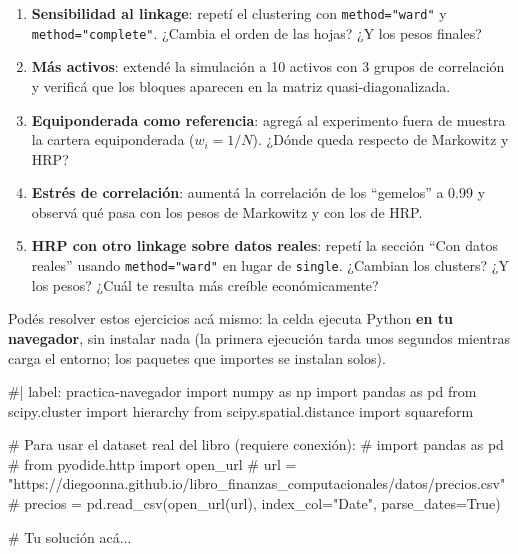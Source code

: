 \documentclass[
  spanish,
  letterpaper,
  DIV=11,
  numbers=noendperiod]{scrreprt}
\newenvironment{Shaded}{\begin{snugshade}}{\end{snugshade}}
\newcommand{\NormalTok}[1]{\textcolor[rgb]{0.00,0.23,0.31}{#1}}
\providecommand{\tightlist}{%
  \setlength{\itemsep}{0pt}\setlength{\parskip}{0pt}}
\begin{document}
\begin{tcolorbox}[enhanced jigsaw, bottomrule=.15mm, colback=white, opacitybacktitle=0.6, arc=.35mm, toprule=.15mm, opacityback=0, breakable, titlerule=0mm, left=2mm, coltitle=black, colbacktitle=quarto-callout-important-color!10!white, colframe=quarto-callout-important-color-frame, leftrule=.75mm, toptitle=1mm, bottomtitle=1mm, title=\textcolor{quarto-callout-important-color}{\faExclamation}\hspace{0.5em}{Ejercicios}, rightrule=.15mm]

\begin{enumerate}
\def\labelenumi{\arabic{enumi}.}
\tightlist
\item
  \textbf{Sensibilidad al linkage}: repetí el clustering con
  \texttt{method="ward"} y \texttt{method="complete"}. ¿Cambia el orden
  de las hojas? ¿Y los pesos finales?
\item
  \textbf{Más activos}: extendé la simulación a 10 activos con 3 grupos
  de correlación y verificá que los bloques aparecen en la matriz
  quasi-diagonalizada.
\item
  \textbf{Equiponderada como referencia}: agregá al experimento fuera de
  muestra la cartera equiponderada (\(w_i = 1/N\)). ¿Dónde queda
  respecto de Markowitz y HRP?
\item
  \textbf{Estrés de correlación}: aumentá la correlación de los
  ``gemelos'' a 0.99 y observá qué pasa con los pesos de Markowitz y con
  los de HRP.
\item
  \textbf{HRP con otro linkage sobre datos reales}: repetí la sección
  ``Con datos reales'' usando \texttt{method="ward"} en lugar de
  \texttt{single}. ¿Cambian los clusters? ¿Y los pesos? ¿Cuál te resulta
  más creíble económicamente?
\end{enumerate}

\end{tcolorbox}

Podés resolver estos ejercicios acá mismo: la celda ejecuta Python
\textbf{en tu navegador}, sin instalar nada (la primera ejecución tarda
unos segundos mientras carga el entorno; los paquetes que importes se
instalan solos).

\begin{Shaded}
\begin{Highlighting}[]
\NormalTok{\#| label: practica{-}navegador}
\NormalTok{import numpy as np}
\NormalTok{import pandas as pd}
\NormalTok{from scipy.cluster import hierarchy}
\NormalTok{from scipy.spatial.distance import squareform}

\NormalTok{\# Para usar el dataset real del libro (requiere conexión):}
\NormalTok{\# import pandas as pd}
\NormalTok{\# from pyodide.http import open\_url}
\NormalTok{\# url = "https://diegoonna.github.io/libro\_finanzas\_computacionales/datos/precios.csv"}
\NormalTok{\# precios = pd.read\_csv(open\_url(url), index\_col="Date", parse\_dates=True)}

\NormalTok{\# Tu solución acá...}
\end{Highlighting}
\end{Shaded}
\end{document}
